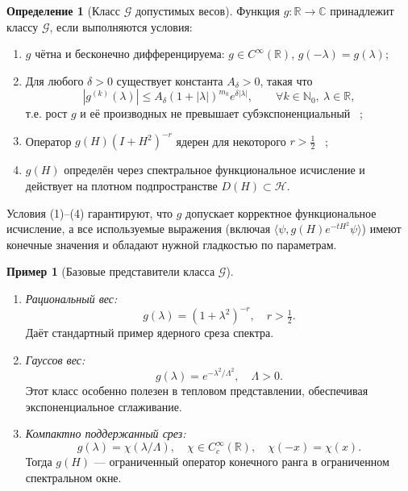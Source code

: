 \documentclass{article}
\numberwithin{equation}{section}
\theoremstyle{plain}
\theoremstyle{definition}
\newtheorem{definition}{Определение}
\newtheorem{example}{Пример}[section]
\theoremstyle{remark}
\def\delta{δ}\def\Delta{Δ}\def\epsilon{ε}\def\zeta{ζ}%
\def\infty{∞}\def\partial{∂}\def\sum{Σ}\def\int{∫}%
\begin{document}
\begin{definition}[Класс $\mathcal G$ допустимых весов]
\label{def:G}
Функция $g:\mathbb R\to\mathbb C$ принадлежит классу $\mathcal G$, если выполняются условия:
\begin{enumerate}
\item $g$ чётна и бесконечно дифференцируема: $g\in C^\infty(\mathbb R)$, $g(-\lambda)=g(\lambda)$;
\item Для любого $\delta>0$ существует константа $A_\delta>0$, такая что
\begin{equation}
\label{eq:G_growth}
|g^{(k)}(\lambda)| \le A_\delta (1+|\lambda|)^{m_k} e^{\delta|\lambda|}, 
\qquad \forall k\in\mathbb N_0, \ \lambda\in\mathbb R,
\end{equation}
т.е. рост $g$ и её производных не превышает субэкспоненциальный ~\cite{GelfandShilov1968};
\item Оператор $g(H)(I+H^2)^{-r}$ ядерен для некоторого $r>\tfrac12$ ~\cite{Simon2005};
\item $g(H)$ определён через спектральное функциональное исчисление и действует на плотном подпространстве $D(H)\subset\mathcal H$.
\end{enumerate}
\end{definition}

\noindent
Условия (1)–(4) гарантируют, что $g$ допускает корректное функциональное исчисление,
а все используемые выражения (включая $\langle\psi,g(H)e^{-tH^2}\psi\rangle$) 
имеют конечные значения и обладают нужной гладкостью по параметрам.

\begin{example}[Базовые представители класса $\mathcal G$]
\label{example:G}
\begin{enumerate}
\item \emph{Рациональный вес:} 
\begin{equation}
g(\lambda) = (1+\lambda^2)^{-r}, \quad r>\tfrac12.
\end{equation}
Даёт стандартный пример ядерного среза спектра.

\item \emph{Гауссов вес:}
\begin{equation}
g(\lambda)=e^{-\lambda^2/\Lambda^2}, \quad \Lambda>0.
\end{equation}
Этот класс особенно полезен в тепловом представлении, обеспечивая экспоненциальное сглаживание.

\item \emph{Компактно поддержанный срез:}
\begin{equation}
g(\lambda)=\chi(\lambda/\Lambda), \quad 
\chi\in C_c^\infty(\mathbb R),\quad \chi(-x)=\chi(x).
\end{equation}
Тогда $g(H)$ — ограниченный оператор конечного ранга в ограниченном спектральном окне.
\end{enumerate}
\end{example}
\end{document}
